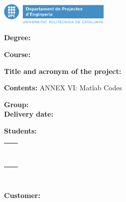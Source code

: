 
\thispagestyle{CoverPage}

\includegraphics[width=0.4\textwidth]{./doc_config/images/UPC_ProjectesEng1.png}

\hspace{30pt} {\scriptsize \textbf{\Seccio}}

\vspace{20pt}

\textbf{Degree:} \Degree

\textbf{Course:} \Course

\vspace{50pt}

\textbf{Title and acronym of the project:}

\hspace{10pt} \ProjectName

\hspace{10pt} \Acronym

\vspace{40pt}

\textbf{Contents:} ANNEX VI: Matlab Codes

\vspace{20pt}

\textbf{Group:} \GrCode\\

\textbf{Delivery date:} \DocDate\\

\vspace{20pt}

\textbf{Students:}\vspace{7pt}

\begin{tabular}{ll}
	\Studi    \hspace*{30pt} & \Studii   \\
	\Studiii  \hspace*{30pt} & \Studiv   \\
	\Studv    \hspace*{30pt} & \Studvi   \\
	\Studvii  \hspace*{30pt} & \Studviii \\
	\Studix   \hspace*{30pt} & \Studx    \\
	\Studxi   \hspace*{30pt} & \Studxii  \\
	\Studxiii \hspace*{30pt} & \Studxiv  \\
	\Studxv   \hspace*{30pt} & \Studxvi  \\
	\Studxvii  \\
	
\end{tabular}\\

\vspace{15pt}

\textbf{Customer:} \Customer